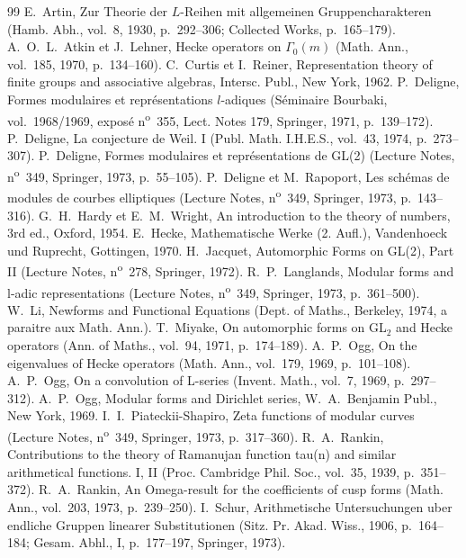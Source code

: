 \documentclass[11pt]{amsart}
\theoremstyle{plain}
\theoremstyle{definition}
\theoremstyle{remark}
\begin{document}
\begin{thebibliography}{99}
 E.~Artin, Zur Theorie der $L$-Reihen mit allgemeinen Gruppencharakteren (Hamb. Abh., vol.~8, 1930, p.~292--306; Collected Works, p.~165--179).
 A.~O.~L.~Atkin et J.~Lehner, Hecke operators on $\Gamma_0(m)$ (Math. Ann., vol.~185, 1970, p.~134--160).
 C.~Curtis et I.~Reiner, Representation theory of finite groups and associative algebras, Intersc. Publ., New York, 1962.
 P.~Deligne, Formes modulaires et repr\'esentations $l$-adiques (S\'eminaire Bourbaki, vol.~1968/1969, expos\'e n\textsuperscript{o}~355, Lect. Notes 179, Springer, 1971, p.~139--172).
 P.~Deligne, La conjecture de Weil. I (Publ. Math. I.H.E.S., vol.~43, 1974, p.~273--307).
 P.~Deligne, Formes modulaires et repr\'esentations de GL(2) (Lecture Notes, n\textsuperscript{o}~349, Springer, 1973, p.~55--105).
 P.~Deligne et M.~Rapoport, Les sch\'emas de modules de courbes elliptiques (Lecture Notes, n\textsuperscript{o}~349, Springer, 1973, p.~143--316).
 G.~H.~Hardy et E.~M.~Wright, An introduction to the theory of numbers, 3rd ed., Oxford, 1954.
 E.~Hecke, Mathematische Werke (2. Aufl.), Vandenhoeck und Ruprecht, Gottingen, 1970.
 H.~Jacquet, Automorphic Forms on GL(2), Part II (Lecture Notes, n\textsuperscript{o}~278, Springer, 1972).
 R.~P.~Langlands, Modular forms and l-adic representations (Lecture Notes, n\textsuperscript{o}~349, Springer, 1973, p.~361--500).
 W.~Li, Newforms and Functional Equations (Dept. of Maths., Berkeley, 1974, a paraitre aux Math. Ann.).
 T.~Miyake, On automorphic forms on GL$_2$ and Hecke operators (Ann. of Maths., vol.~94, 1971, p.~174--189).
 A.~P.~Ogg, On the eigenvalues of Hecke operators (Math. Ann., vol.~179, 1969, p.~101--108).
 A.~P.~Ogg, On a convolution of L-series (Invent. Math., vol.~7, 1969, p.~297--312).
 A.~P.~Ogg, Modular forms and Dirichlet series, W.~A.~Benjamin Publ., New York, 1969.
 I.~I.~Piateckii-Shapiro, Zeta functions of modular curves (Lecture Notes, n\textsuperscript{o}~349, Springer, 1973, p.~317--360).
 R.~A.~Rankin, Contributions to the theory of Ramanujan function tau(n) and similar arithmetical functions. I, II (Proc. Cambridge Phil. Soc., vol.~35, 1939, p.~351--372).
 R.~A.~Rankin, An Omega-result for the coefficients of cusp forms (Math. Ann., vol.~203, 1973, p.~239--250).
 I.~Schur, Arithmetische Untersuchungen uber endliche Gruppen linearer Substitutionen (Sitz. Pr. Akad. Wiss., 1906, p.~164--184; Gesam. Abhl., I, p.~177--197, Springer, 1973).

\end{thebibliography}
\end{document}
